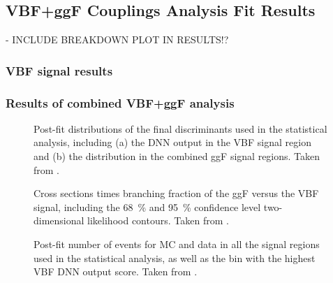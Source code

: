 
\subsection{\HWW VBF+ggF Couplings Analysis Fit Results}

- INCLUDE BREAKDOWN PLOT IN RESULTS!?


\subsubsection{VBF signal results}

\subsubsection{Results of combined VBF+ggF analysis}

\begin{figure}
    \caption{Post-fit distributions of the final discriminants used in the statistical analysis, including (a) the DNN output in the VBF signal region and (b) the \mT distribution in the combined ggF signal regions. Taken from .}
    \label{fig:post-fit-final-discriminatns}
\end{figure}

\begin{figure}
    \caption{Cross sections times branching fraction of the ggF versus the VBF signal, including the \SI{68}{\percent} and \SI{95}{\percent} confidence level two-dimensional likelihood contours. Taken from .}
    \label{fig:avocado-plot}
\end{figure}

\begin{figure}
    \caption{Post-fit number of events for MC and data in all the signal regions used in the statistical analysis, as well as the bin with the highest VBF DNN output score. Taken from .}
    \label{fig:post-fit-yields}
\end{figure}


